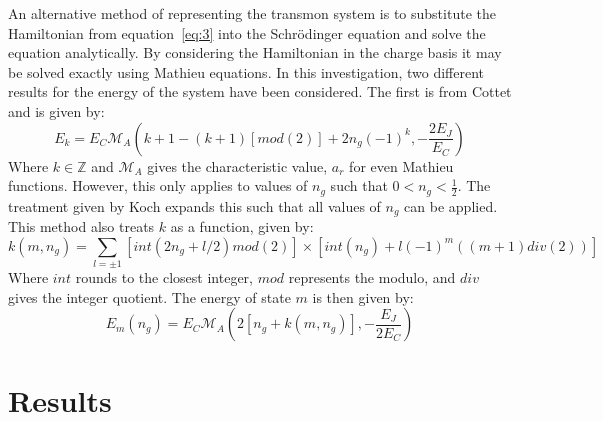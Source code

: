 \documentclass[11pt]{article}
\begin{document}
An alternative method of representing the transmon system is to substitute the Hamiltonian from equation~\ref{eq:3} into the Schr\"odinger equation and solve the equation analytically.
By considering the Hamiltonian in the charge basis it may be solved exactly using Mathieu equations. In this investigation, two different results for the energy of the system have been considered. The first is from Cottet and is given by:
\begin{equation} \label{eq:7}
E_k = E_C \mathcal{M}_A (k+1 - (k+1)[mod(2)] + 2n_g(-1)^k, -\frac{2E_J}{E_C})
\end{equation}
Where $k \in \mathbb{Z}$ and $\mathcal{M}_A$ gives the characteristic value, $a_r$ for even Mathieu functions. However, this only applies to values of $n_g$ such that $0 < n_g < \frac{1}{2}$. The treatment given by Koch expands this such that all values of $n_g$ can be applied. This method also treats $k$ as a function, given by:
\begin{equation} \label{eq:8}
k(m, n_g) = \sum_{l=\pm 1} [int(2n_g + l/2)mod(2)] \times [int(n_g) + l(-1)^m ((m+1)div(2))]
\end{equation}
Where $int$ rounds to the closest integer, $mod$ represents the modulo, and $div$ gives the integer quotient.  The energy of state $m$ is then given by:
\begin{equation} \label{eq:9}
E_m(n_g) = E_C \mathcal{M}_A (2[n_g + k(m,n_g)],-\frac{E_J}{2E_C})
\end{equation}


\section{Results}
\end{document}
